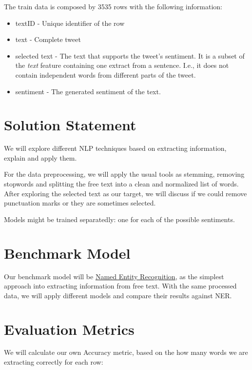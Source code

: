 \documentclass[11pt]{article}
\begin{document}
The train data is composed by 3535 rows with the following information:
\begin{itemize}
    \item textID - Unique identifier of the row
    \item text - Complete tweet
    \item selected text - The text that supports the tweet's sentiment. It is a subset of the \textit{text} feature containing one extract from a sentence. I.e., it does not contain independent words from different parts of the tweet.
    \item sentiment - The generated sentiment of the text.
\end{itemize}

\section{Solution Statement}

We will explore different NLP techniques based on extracting information, explain and apply them.

For the data preprocessing, we will apply the usual tools as stemming, removing stopwords and splitting the free text into a clean and normalized list of words. After exploring the selected text as our target, we will discuss if we could remove punctuation marks or they are sometimes selected.

Models might be trained separatedly: one for each of the possible sentiments.

\section{Benchmark Model}

Our benchmark model will be \href{https://en.wikipedia.org/wiki/Named-entity_recognition}{Named Entity Recognition}, as the simplest approach into extracting information from free text.
With the same processed data, we will apply different models and compare their results against NER.

\section{Evaluation Metrics}

We will calculate our own Accuracy metric, based on the how many words we are extracting correctly for each row:
\end{document}
